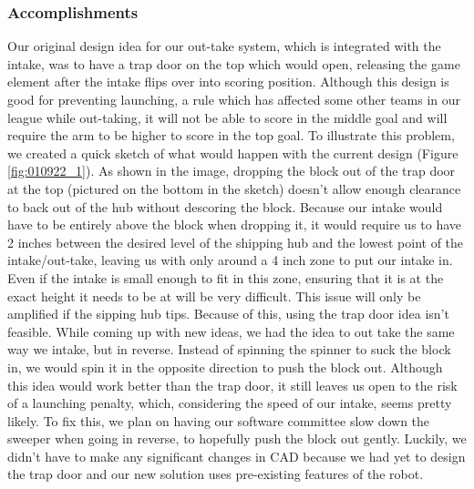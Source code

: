 \subsubsection*{Accomplishments}
Our original design idea for our out-take system, which is integrated with the intake, was to have a trap door on the top which would open, releasing the game element after the intake flips over into scoring position. Although this design is good for preventing launching, a rule which has affected some other teams in our league while out-taking, it will not be able to score in the middle goal and will require the arm to be higher to score in the top goal. To illustrate this problem, we created a quick sketch of what would happen with the current design (Figure \ref{fig:010922_1}). As shown in the image, dropping the block out of the trap door at the top (pictured on the bottom in the sketch) doesn’t allow enough clearance to back out of the hub without descoring the block. Because our intake would have to be entirely above the block when dropping it, it would require us to have 2 inches between the desired level of the shipping hub and the lowest point of the intake/out-take, leaving us with only around a 4 inch zone to put our intake in. Even if the intake is small enough to fit in this zone, ensuring that it is at the exact height it needs to be at will be very difficult. This issue will only be amplified if the sipping hub tips. Because of this, using the trap door idea isn’t feasible.
While coming up with new ideas, we had the idea to out take the same way we intake, but in reverse. Instead of spinning the spinner to suck the block in, we would spin it in the opposite direction to push the block out. Although this idea would work better than the trap door, it still leaves us open to the risk of a launching penalty, which, considering the speed of our intake, seems pretty likely. To fix this, we plan on having our software committee slow down the sweeper when going in reverse, to hopefully push the block out gently. Luckily, we didn’t have to make any significant changes in CAD because we had yet to design the trap door and our new solution uses pre-existing  features of the robot.

 


